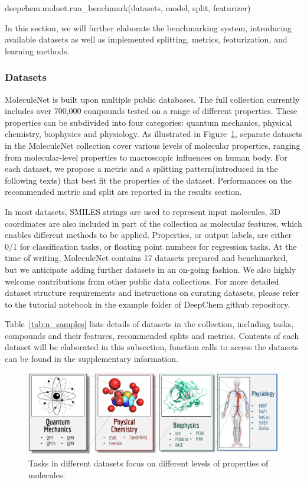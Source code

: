 {\selectfont
deepchem.molnet.run\_benchmark(datasets, model, split, featurizer)
}

In this section, we will further elaborate the benchmarking system, introducing available datasets as well as implemented splitting, metrics, featurization, and learning methods.


\subsubsection{Datasets}
MoleculeNet is built upon multiple public databases. The full collection currently includes over 700,000 compounds tested on a range of different properties. These properties can be subdivided into four categories: quantum mechanics, physical chemistry, biophysics and physiology. As illustrated in Figure~\ref{fig:dataset_composition}, separate datasets in the MoleculeNet collection cover various levels of molecular properties, ranging from molecular-level properties to macroscopic influences on human body. For each dataset, we propose a metric and a splitting pattern(introduced in the following texts) that best fit the properties of the dataset. Performances on the recommended metric and split are reported in the results section.

In most datasets, SMILES strings\cite{SMILES} are used to represent input molecules, 3D coordinates are also included in part of the collection as molecular features, which enables different methods to be applied. Properties, or output labels, are either 0/1 for classification tasks, or floating point numbers for regression tasks. At the time of writing, MoleculeNet contains 17 datasets prepared and benchmarked, but we anticipate adding further datasets in an on-going fashion. We also highly welcome contributions from other public data collections. For more detailed dataset structure requirements and instructions on curating datasets, please refer to the tutorial notebook in the example folder of DeepChem github repository.

Table~\ref{tab:n_samples} lists details of datasets in the collection, including tasks, compounds and their features, recommended splits and metrics. Contents of each dataset will be elaborated in this subsection, function calls to access the datasets can be found in the supplementary information\dag.

\begin{figure}[h]
  \centering
  \includegraphics[width=.85\textwidth]{Images/dataset_composition.png}
  \caption{Tasks in different datasets focus on different levels of properties of molecules.}
  \label{fig:dataset_composition}
\end{figure}

